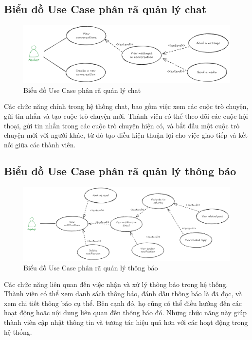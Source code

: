 \documentclass[../index.tex]{subfiles}
\begin{document}
    \subsection{Biểu đồ Use Case phân rã quản lý chat}
    \begin{figure}[H]
        \centering
        \includegraphics[width=0.85\linewidth]{
            figures/usecase-chat-management.png
        }
        \caption{Biểu đồ Use Case phân rã quản lý chat}
    \end{figure}
    Các chức năng chính trong hệ thống chat, bao gồm việc xem các cuộc trò chuyện,
    gửi tin nhắn và tạo cuộc trò chuyện mới. Thành viên có thể theo dõi các cuộc
    hội thoại, gửi tin nhắn trong các cuộc trò chuyện hiện có, và bắt đầu một cuộc
    trò chuyện mới với người khác, từ đó tạo điều kiện thuận lợi cho việc giao
    tiếp và kết nối giữa các thành viên.

    \subsection{Biểu đồ Use Case phân rã quản lý thông báo}
    \begin{figure}[H]
        \centering
        \includegraphics[width=0.85\linewidth]{
            figures/usecase-notification-management.png
        }
        \caption{Biểu đồ Use Case phân rã quản lý thông báo}
    \end{figure}
    Các chức năng liên quan đến việc nhận và xử lý thông báo trong hệ thống. Thành
    viên có thể xem danh sách thông báo, đánh dấu thông báo là đã đọc, và xem chi
    tiết thông báo cụ thể. Bên cạnh đó, họ cũng có thể điều hướng đến các hoạt động
    hoặc nội dung liên quan đến thông báo đó. Những chức năng này giúp thành
    viên cập nhật thông tin và tương tác hiệu quả hơn với các hoạt động trong hệ
    thống.
\end{document}
